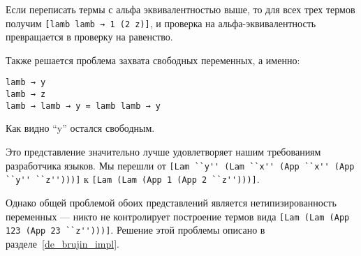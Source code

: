 Если переписать термы с альфа эквивалентностью выше, то для всех трех термов получим \lstinline{[lamb lamb → 1 (2 z)]}, и проверка на альфа-эквивалентность превращается в проверку на равенство.

Также решается проблема захвата свободных переменных, а именно:
\begin{lstlisting}
lamb → y
lamb → z
lamb → lamb → y = lamb lamb → y
\end{lstlisting}

Как видно ``y'' остался свободным.

Это представление значительно лучше удовлетворяет нашим требованиям разработчика языков. Мы перешли от
\lstinline{[Lam ``y'' (Lam ``x'' (App ``x'' (App ``y'' ``z'')))]} к \lstinline{[Lam (Lam (App 1 (App 2 ``z'')))]}.

Однако общей проблемой обоих представлений является нетипизированность переменных --- никто не контролирует построение термов вида \lstinline{[Lam (Lam (App 123 (App 23 ``z'')))]}. Решение этой проблемы описано в разделе~\ref{de_brujin_impl}.
